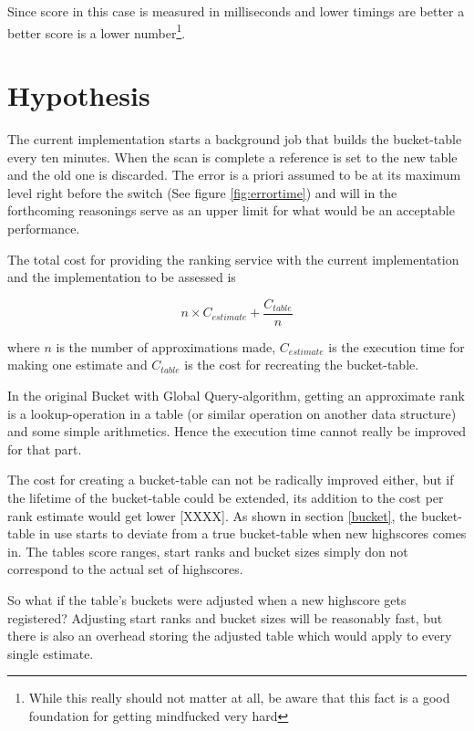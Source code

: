 Since score in this case is measured in milliseconds and lower timings are better a better score is a lower number\footnote{While this really should not matter at all, be aware that this fact is a good foundation for getting mindfucked very hard}.

\section{Hypothesis} 

The current implementation starts a background job that builds the bucket-table every ten minutes. When the scan is complete a reference is set to the new table and the old one is discarded. The error is a priori assumed to be at its maximum level right before the switch (See figure \ref{fig:errortime}) and will in the forthcoming reasonings serve as an upper limit for what would be an acceptable performance.

The total cost for providing the ranking service with the current implementation and the implementation to be assessed is

\begin{equation}
  n \times C_{estimate} + \frac{ C_{table}}{n}
\end{equation}

where $n$ is the number of approximations made, $C_{estimate}$ is the execution time for making one estimate and $C_{table}$ is the cost for recreating the bucket-table.

In the original Bucket with Global Query-algorithm, getting an approximate rank is a lookup-operation in a table (or similar operation on another data structure) and some simple arithmetics. Hence the execution time cannot really be improved for that part.

The cost for creating a bucket-table can not be radically improved either, but if the lifetime of the bucket-table could be extended, its addition to the cost per rank estimate would get lower [XXXX]. As shown in section \ref{bucket}, the bucket-table in use starts to deviate from a true bucket-table when new highscores comes in. The tables score ranges, start ranks and bucket sizes simply don not correspond to the actual set of highscores.

So what if the table's buckets were adjusted when a new highscore gets registered? Adjusting start ranks and bucket sizes will be reasonably fast, but there is also an overhead storing the adjusted table which would apply to every single estimate.

